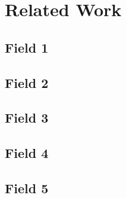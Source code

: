 
\chapter{Related Work}

\blindtext

\section{Field 1} 
\blindtext

\section{Field 2} 
\blindtext

\section{Field 3} 
\blindtext

\section{Field 4} 
\blindtext

\section{Field 5} 
\blindtext

\newpage






